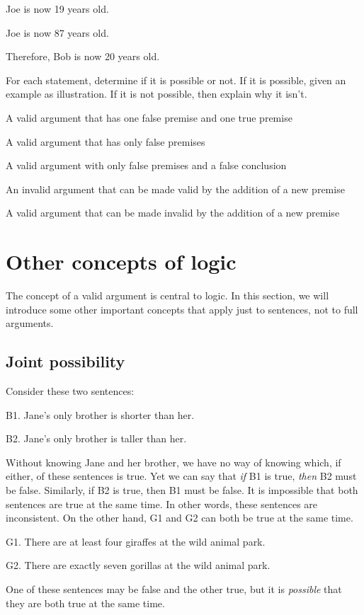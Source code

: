 \begin{earg}
\item Joe is now 19 years old.
\item Joe is now 87 years old.
\item Therefore, Bob is now 20 years old.
\end{earg}

\problempart
\label{pr.EnglishCombinations}
For each statement, determine if it is possible or not. If it is possible, given an example as illustration. If it is not possible, then explain why it isn't.
	\begin{earg}
		\item A valid argument that has one false premise and one true premise
		\item A valid argument that has only false premises
		\item A valid argument with only false premises and a false conclusion
		\item An invalid argument that can be made valid by the addition of a new premise
		\item A valid argument that can be made invalid by the addition of a new premise
	\end{earg}



\chapter{Other concepts of logic}\label{s:BasicNotions}

The concept of a valid argument is central to logic. In this section, we will introduce some other important concepts that apply just to sentences, not to full arguments. 

\section{Joint possibility}\label{s:joint-poss}

Consider these two sentences:
	\begin{ebullet}
		\item[B1.] Jane's only brother is shorter than her.
		\item[B2.] Jane's only brother is taller than her.
	\end{ebullet}
Without knowing Jane and her brother, we have no way of knowing which, if either, of these sentences is true. Yet we can say that \emph{if} B1 is true, \emph{then} B2 must be false. Similarly, if B2 is true, then B1 must be false. It is impossible that both sentences are true at the same time. In other words, these sentences are inconsistent. On the other hand, G1 and G2 can both be true at the same time.
	\begin{ebullet}	
		\item[G1.] \label{MartianGiraffes} There are at least four giraffes at the wild animal park.
		\item[G2.] There are exactly seven gorillas at the wild animal park.
	\end{ebullet}
One of these sentences may be false and the other true, but it  is \textit{possible} that they are both true at the same time. 

